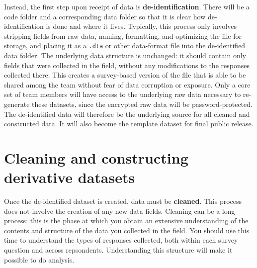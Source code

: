 Instead, the first step upon receipt of data is \textbf{de-identification}.
There will be a code folder and a corresponding data folder
so that it is clear how de-identification is done and where it lives.
Typically, this process only involves stripping fields from raw data,
naming, formatting, and optimizing the file for storage,
and placing it as a \texttt{.dta} or other data-format file
into the de-identified data folder.
The underlying data structure is unchanged:
it should contain only fields that were collected in the field,
without any modifications to the responses collected there.
This creates a survey-based version of the file that is able
to be shared among the team without fear of data corruption or exposure.
Only a core set of team members will have access to the underlying
raw data necessary to re-generate these datasets,
since the encrypted raw data will be password-protected.
The de-identified data will therefore be the underlying source
for all cleaned and constructed data.
It will also become the template dataset for final public release.


\section{Cleaning and constructing derivative datasets}

Once the de-identified dataset is created, data must be \textbf{cleaned}.
This process does not involve the creation of any new data fields.
Cleaning can be a long process: this is the phase at which
you obtain an extensive understanding of the contents and structure
of the data you collected in the field.
You should use this time to understand the types of responses collected,
both within each survey question and across repsondents.
Understanding this structure will make it possible to do analysis.

